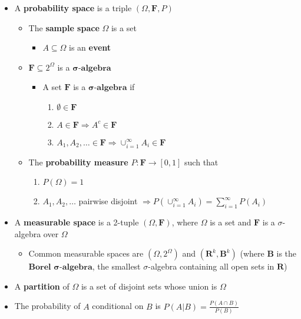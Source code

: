 \documentclass[12pt,english]{article}
\begin{document}
\begin{itemize}
	\item A \textbf{probability space} is a triple $(\Omega, \mathbf{F}, P)$
	\begin{itemize}
		\item The \textbf{sample space} $\Omega$ is a set
		\begin{itemize}
			\item $A \subseteq \Omega$ is an \textbf{event}
		\end{itemize}
		\item $\mathbf{F} \subseteq 2^{\Omega}$ is a $\mathbf{\sigma}\textbf{-algebra}$
		\begin{itemize}
			\item A set $\mathbf{F}$ is a $\mathbf{\sigma}\textbf{-algebra}$ if
			\begin{enumerate}
				\item $\emptyset \in \mathbf{F}$
				\item $A \in \mathbf{F} \Rightarrow A^{c} \in \mathbf{F}$
				\item $A_{1}, A_{2}, \ldots \in \mathbf{F} \Rightarrow \cup_{i=1}^{\infty} A_{i} \in \mathbf{F}$
			\end{enumerate}
		\end{itemize}
		\item The \textbf{probability measure} $P : \mathbf{F} \to [0,1]$ such that
		\begin{enumerate}
			\item $P(\Omega) = 1$
			\item $A_{1}, A_{2}, \ldots$ pairwise disjoint $\Rightarrow P(\cup_{i = 1}^{\infty} A_{i}) = \sum_{i = 1}^{\infty} P(A_{i})$
		\end{enumerate}
	\end{itemize}
	\item A \textbf{measurable space} is a 2-tuple $(\Omega, \mathbf{F})$, where $\Omega$ is a set and $\mathbf{F}$ is a $\sigma$-algebra over $\Omega$
	\begin{itemize}
		\item Common measurable spaces are $(\Omega, 2^{\Omega})$ and $(\mathbf{R}^{k}, \mathbf{B}^{k})$ (where $\mathbf{B}$ is the $\textbf{Borel }\mathbf{\sigma}\textbf{-algebra}$, the smallest $\sigma$-algebra containing all open sets in $\mathbf{R}$)
	\end{itemize}
	\item A \textbf{partition} of $\Omega$ is a set of disjoint sets whose union is $\Omega$
	\item The probability of $A$ conditional on $B$ is $P(A | B) = \frac{P(A \cap B)}{P(B)}$

\end{itemize}
\end{document}

